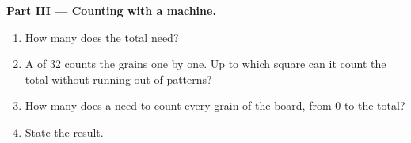\begin{problem}
\medskip\noindent\textbf{Part III --- Counting with a machine.}
\begin{enumerate}[resume]
  \item How many  does the total need?
  \item A  of 32  counts the grains one by one. Up to which
    square can it count the total without running out of patterns?
  \item How many  does a  need to count every grain of the
    board, from 0 to the total?
  \item State the result.
\end{enumerate}
\end{problem}
